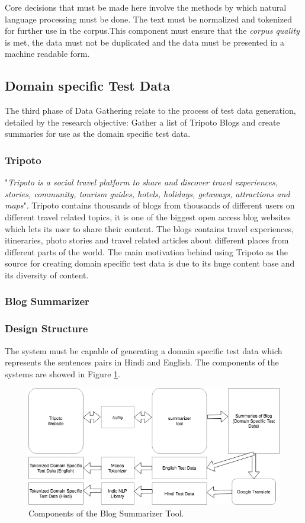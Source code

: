 Core decisions that must be made here involve the methods by which natural language processing must be done. The text must be normalized and tokenized for further use in the corpus.This component must ensure that the \textit{corpus quality} is met, the data must not be duplicated and the data must be presented in a machine readable form.

\subsection{Domain specific Test Data}
The third phase of Data Gathering relate to the process of test data generation, detailed by the research objective: Gather a list of Tripoto Blogs and create summaries for use as the domain specific test data.
\subsubsection{Tripoto}
"\textit{Tripoto is a social travel platform to share and discover  travel experiences, stories, community, tourism guides, hotels, holidays, getaways, attractions and maps}".  Tripoto contains thousands of blogs from thousands of different users on different travel related topics, it is one of the biggest open access blog websites which lets its user to share their content. The blogs contains travel experiences, itineraries, photo stories and travel related articles about different places from different parts of the world. The main motivation behind using Tripoto as the source for creating domain specific test data is due to its huge content base and its diversity of content. 
\subsubsection{Blog Summarizer}
\subsubsection{Design Structure}
The system must be capable of generating a domain specific test data which represents the sentences pairs in Hindi and English. The components of the systems are showed in Figure \ref{summarizer}.

\begin{figure}[h]
\includegraphics[width=\textwidth]{figures/design4.png}
\caption{Components of the Blog Summarizer Tool.} \label{summarizer}
\end{figure}

